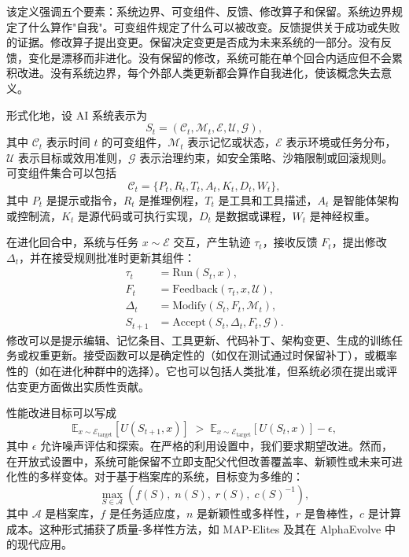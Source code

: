 该定义强调五个要素：系统边界、可变组件、反馈、修改算子和保留。系统边界规定了什么算作"自我"。可变组件规定了什么可以被改变。反馈提供关于成功或失败的证据。修改算子提出变更。保留决定变更是否成为未来系统的一部分。没有反馈，变化是漂移而非进化。没有保留的修改，系统可能在单个回合内适应但不会累积改进。没有系统边界，每个外部人类更新都会算作自我进化，使该概念失去意义。

形式化地，设 AI 系统表示为
\begin{equation}
S_t = (\mathcal{C}_t, \mathcal{M}_t, \mathcal{E}, \mathcal{U}, \mathcal{G}),
\end{equation}
其中 $\mathcal{C}_t$ 表示时间 $t$ 的可变组件，$\mathcal{M}_t$ 表示记忆或状态，$\mathcal{E}$ 表示环境或任务分布，$\mathcal{U}$ 表示目标或效用准则，$\mathcal{G}$ 表示治理约束，如安全策略、沙箱限制或回滚规则。可变组件集合可以包括
\begin{equation}
\mathcal{C}_t = \{P_t, R_t, T_t, A_t, K_t, D_t, W_t\},
\end{equation}
其中 $P_t$ 是提示或指令，$R_t$ 是推理例程，$T_t$ 是工具和工具描述，$A_t$ 是智能体架构或控制流，$K_t$ 是源代码或可执行实现，$D_t$ 是数据或课程，$W_t$ 是神经权重。

在进化回合中，系统与任务 $x\sim\mathcal{E}$ 交互，产生轨迹 $\tau_t$，接收反馈 $F_t$，提出修改 $\Delta_t$，并在接受规则批准时更新其组件：
\begin{align}
\tau_t &= \mathrm{Run}(S_t, x), \\
F_t &= \mathrm{Feedback}(\tau_t, x, \mathcal{U}), \\
\Delta_t &= \mathrm{Modify}(S_t, F_t, \mathcal{M}_t), \\
S_{t+1} &= \mathrm{Accept}(S_t, \Delta_t, F_t, \mathcal{G}).
\end{align}
修改可以是提示编辑、记忆条目、工具更新、代码补丁、架构变更、生成的训练任务或权重更新。接受函数可以是确定性的（如仅在测试通过时保留补丁），或概率性的（如在进化种群中的选择）。它也可以包括人类批准，但系统必须在提出或评估变更方面做出实质性贡献。

性能改进目标可以写成
\begin{equation}
\mathbb{E}_{x\sim\mathcal{E}_{\mathrm{target}}}\left[ U(S_{t+1},x) \right]
\;>\;
\mathbb{E}_{x\sim\mathcal{E}_{\mathrm{target}}}\left[ U(S_t,x) \right] - \epsilon,
\end{equation}
其中 $\epsilon$ 允许噪声评估和探索。在严格的利用设置中，我们要求期望改进。然而，在开放式设置中，系统可能保留不立即支配父代但改善覆盖率、新颖性或未来可进化性的多样变体。对于基于档案库的系统，目标变为多维的：
\begin{equation}
\max_{S\in\mathcal{A}} \left( f(S),\; n(S),\; r(S),\; c(S)^{-1} \right),
\end{equation}
其中 $\mathcal{A}$ 是档案库，$f$ 是任务适应度，$n$ 是新颖性或多样性，$r$ 是鲁棒性，$c$ 是计算成本。这种形式捕获了质量-多样性方法，如 MAP-Elites \cite{mouret2015illuminating} 及其在 AlphaEvolve \cite{alphaevolve2025} 中的现代应用。

